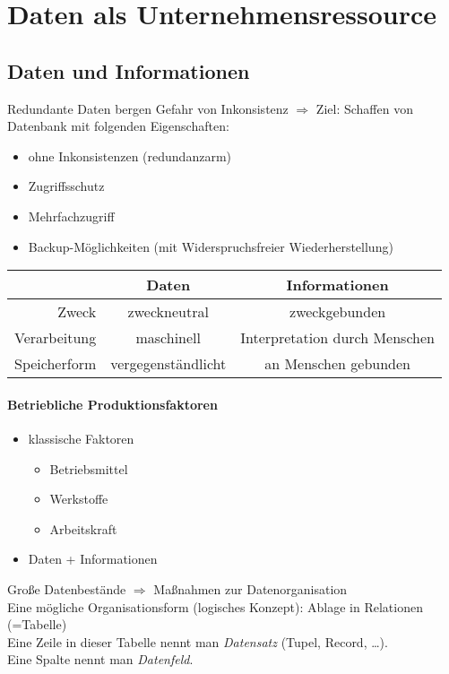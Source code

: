 \section{Daten als Unternehmensressource}
\subsection{Daten und Informationen}
Redundante Daten bergen Gefahr von Inkonsistenz $\Rightarrow$ Ziel: Schaffen von Datenbank mit folgenden Eigenschaften:
\begin{itemize}
\item ohne Inkonsistenzen (redundanzarm)
\item Zugriffsschutz
\item Mehrfachzugriff
\item Backup-Möglichkeiten (mit Widerspruchsfreier Wiederherstellung)
\end{itemize}

\begin{tabular}{r | c c}
& Daten & Informationen\\
\hline
Zweck & zweckneutral & zweckgebunden\\
Verarbeitung & maschinell & Interpretation durch Menschen\\
Speicherform & vergegenständlicht & an Menschen gebunden\\
\end{tabular}
\paragraph{Betriebliche Produktionsfaktoren}
\begin{itemize}
\item klassische Faktoren
\begin{itemize}
\item Betriebsmittel
\item Werkstoffe
\item Arbeitskraft
\end{itemize}
\item Daten + Informationen
\end{itemize}

Große Datenbestände $\Rightarrow$ Maßnahmen zur Datenorganisation\bigskip\\
Eine mögliche Organisationsform (logisches Konzept): Ablage in Relationen (=Tabelle)\bigskip\\
Eine Zeile in dieser Tabelle nennt man \emph{Datensatz} (Tupel, Record, …).\\
Eine Spalte nennt man \emph{Datenfeld}.

